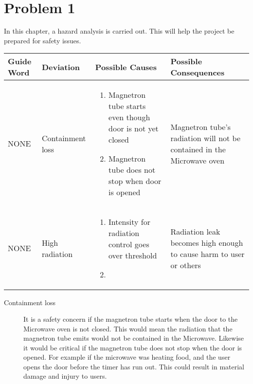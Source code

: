 \chapter{Problem 1}
\label{chp:one}


In this chapter, a hazard analysis is carried out. This will help the project be prepared for safety issues. 

\begin{center}
	\begin{tabular}{p{2.1cm} | p{2.9cm} | p{5cm} | p{4cm} }
		Guide Word & Deviation & Possible Causes & Possible Consequences \\\hline
		NONE & Containment loss & 
		\begin{enumerate}
			\item Magnetron tube starts even though door is not yet closed 
			\item Magnetron tube does not stop when door is opened 
		\end{enumerate}
		 & Magnetron tube's radiation will not be contained in the Microwave oven \\\hline
		
		NONE & High radiation & 
		\begin{enumerate}
			\item Intensity for radiation control goes over threshold 
			\item 
		\end{enumerate}
		& Radiation leak becomes high enough to cause harm to user or others\\\hline
	\end{tabular}
\end{center}

\begin{description}
	\item[Containment loss] It is a safety concern if the magnetron tube starts when the door to the Microwave oven is not closed. This would mean the radiation that the magnetron tube emits would not be contained in the Microwave. Likewise it would be critical if the magnetron tube does not stop when the door is opened. For example if the microwave was heating food, and the user opens the door before the timer has run out. This could result in material damage and injury to users.
\end{description}